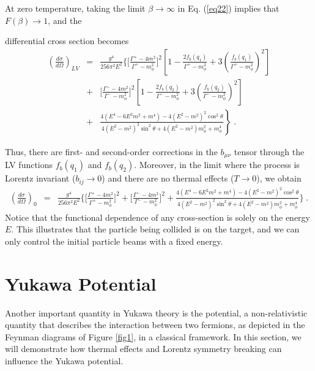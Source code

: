 \documentclass[11pt,showpacs,preprintnumbers,amsmath,amssymb,prd,nofootinbib,superscriptaddress]{revtex4-2}
\begin{document}
At zero temperature, taking the limit $\beta \to \infty$ in Eq. (\ref{eq22}) implies that $F(\beta) \to 1$, and the {differential cross section  becomes
{\color{red} \begin{eqnarray}
\left(\frac{d\sigma}{d\Omega}\right)_{LV}&=&\frac{g^4}{256\pi^2 E^2}\Biggl\{\biggl[\frac{\Gamma^{+}-4m^2}{\Gamma^{+}-m_\phi^2}\biggr]^2\left[1-\frac{2f_b(q_1)}{\Gamma^{+}-m_\phi^2}+3\left(\frac{f_b(q_1)}{\Gamma^{+}-m_\phi^2}\right)^2\right]\nonumber\\&+&\biggl[\frac{\Gamma^{-}-4m^2}{\Gamma^{-}-m_\phi^2}\biggr]^2\left[1-\frac{2f_b(q_2)}{\Gamma^{-}-m_\phi^2}+3\left(\frac{f_b(q_2)}{\Gamma^{-}-m_\phi^2}\right)^2\right]\nonumber\\ &+&\left.\frac{4(E^4-6E^2m^2+m^4)-4(E^2-m^2)^2\cos^2{\theta}}{4(E^2-m^2)^2\sin^2{\theta}+4(E^2-m^2)m_\phi^2+m_\phi^4}\right\}\;.\end{eqnarray}}



Thus, there are first- and second-order corrections in the $b_{\mu \nu}$ tensor through the { LV functions $f_b(q_1)$ and $f_b(q_2)$}. Moreover, in the limit where the process is Lorentz invariant ($b_{ij} \to 0$) and there are no thermal effects ($T \to 0$), we obtain
\small{{\color{red}\begin{eqnarray}
   \left(\frac{d\sigma}{d\Omega}\right)_{0}&=&\frac{g^4}{256\pi^2 E^2}\biggl\{\biggl[\frac{\Gamma^{+}-4m^2}{\Gamma^{+}-m_\phi^2}\biggr]^2+\biggl[\frac{\Gamma^{-}-4m^2}{\Gamma^{-}-m_\phi^2}\biggr]^2+\frac{4(E^4-6E^2m^2+m^4)-4(E^2-m^2)^2\cos^2{\theta}}{4(E^2-m^2)^2\sin^2{\theta}+4(E^2-m^2)m_\phi^2+m_\phi^4}\biggr\}\;.
\end{eqnarray}}}
Notice that the functional dependence of any cross-section is solely on the energy $E$. This illustrates that the particle being collided is on the target, and we can only control the initial particle beams with a fixed energy.




\section{Yukawa Potential}\label{secpotential}

Another important quantity in Yukawa theory is the potential, a non-relativistic quantity that describes the interaction between two fermions, as depicted in the Feynman diagrams of Figure \ref{fig1}, in a classical framework. In this section, we will demonstrate how thermal effects and Lorentz symmetry breaking \cite{altschul} can influence the Yukawa potential.

}
\end{document}
